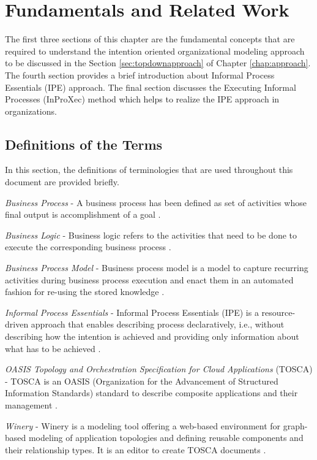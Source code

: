 \chapter{Fundamentals and Related Work}
\label{chap:fundamentals}
The first three sections of this chapter are the fundamental concepts that are required to understand the intention oriented organizational modeling approach to be discussed in the Section \ref{sec:topdownapproach} of Chapter \ref{chap:approach}. The fourth section provides a brief introduction about Informal Process Essentials (IPE) approach. The final section discusses the Executing Informal Processes (InProXec) method which helps to realize the IPE approach in organizations.

\section{Definitions of the Terms}
\label{sec:termdefinitions}
In this section, the definitions of terminologies that are used throughout this document are provided briefly.

\textit{Business Process} -  A business process has been defined as set of activities whose final output is accomplishment of a goal \cite{Weske2012}.  

\textit{Business Logic} - Business logic refers to the activities that need to be done to execute the corresponding business process \cite{Weske2012}. 

\textit{Business Process Model} - Business process model is a model to capture recurring activities during business process execution and enact them in an automated fashion for re-using the stored knowledge \cite{Weske2012}. 

\textit{Informal Process Essentials} - Informal Process Essentials (IPE) is a resource-driven approach that enables describing process declaratively, i.e., without describing how the intention is achieved and providing only information about what has to be achieved \cite{Sungur2014a}. 

\textit{OASIS Topology and Orchestration Specification for Cloud Applications} (TOSCA) - TOSCA is an OASIS (Organization for the Advancement of Structured Information Standards) standard to describe composite applications and their management \cite{Kopp2013}.  

\textit{Winery} - Winery is a modeling tool offering a web-based environment for graph-based modeling of application topologies and defining reusable components and their relationship types. It is an editor to create TOSCA documents \cite{Kopp2013}. 

